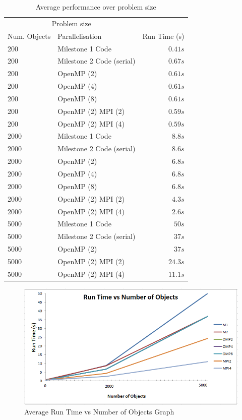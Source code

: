 \documentclass[twoside,twocolumn]{article}
\begin{document}
	\begin{table}[H]
		\caption{Average performance over problem size}
		\centering
		\begin{tabular}{llr}
			\toprule
			\multicolumn{2}{c}{Problem size} \\
			\cmidrule(r){1-2}
			Num. Objects & Parallelisation & Run Time (s) \\
			\midrule
			200 & Milestone 1 Code & $0.41s$ \\
			200 & Milestone 2 Code (serial) & $0.67s$ \\
			200 & OpenMP (2) & $0.61s$ \\
			200 & OpenMP (4) & $0.61s$ \\
			200 & OpenMP (8) & $0.61s$ \\
			200 & OpenMP (2) MPI (2) & $0.59s$ \\
			200 & OpenMP (2) MPI (4) & $0.59s$ \\
			\midrule
			2000 & Milestone 1 Code & $8.8s$ \\
			2000 & Milestone 2 Code (serial) & $8.6s$ \\
			2000 & OpenMP (2) & $6.8s$ \\
			2000 & OpenMP (4) & $6.8s$ \\
			2000 & OpenMP (8) & $6.8s$ \\
			2000 & OpenMP (2) MPI (2) & $4.3s$ \\
			2000 & OpenMP (2) MPI (4) & $2.6s$ \\
			\midrule
			5000 & Milestone 1 Code & $50s$ \\
			5000 & Milestone 2 Code (serial) & $37s$ \\
			5000 & OpenMP (2) & $37s$ \\
			5000 & OpenMP (2) MPI (2) & $24.3s$ \\
			5000 & OpenMP (2) MPI (4) & $11.1s$ \\

			\bottomrule
		\end{tabular}
	\end{table}	
	
		\begin{figure}
			\caption{Average Run Time vs Number of Objects Graph}
			\includegraphics[scale=.9]{graph.png}
		\end{figure}
\end{document}

